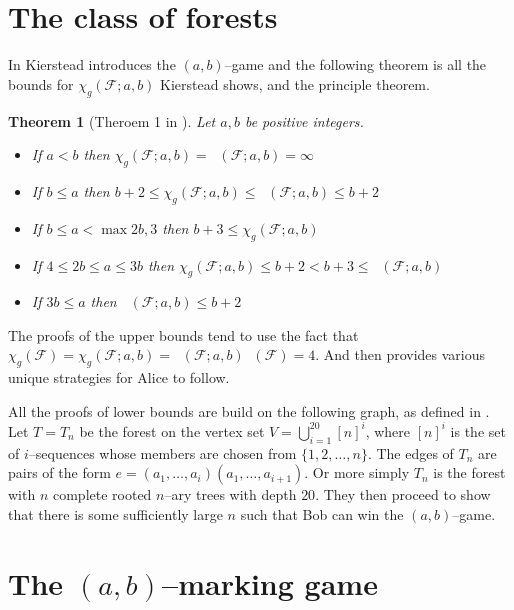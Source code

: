 \documentclass[11pt]{article}
\numberwithin{figure}{section}
\newtheorem{theorem}{Theorem}
\theoremstyle{definition}
\newcommand{\FF}{\mathcal{F}} %
\DeclareMathOperator{\col}{col_g}
\begin{document}
    \section{The class of forests}
    In \cite{kierstead2005} Kierstead introduces the $(a,b)$--game and the following theorem is all the bounds for $\chi_g(\FF;a,b)$ Kierstead shows, and the principle theorem.     
    \begin{theorem} [Theroem 1 in \cite{kierstead2005}]
        Let $a,b$ be positive integers.
        \begin{itemize}
            \item If $a<b$ then $\chi_g(\FF;a,b)=\col(\FF;a,b)=\infty$
            \item If $b\leq a$ then $b+2\leq \chi_g(\FF;a,b)\leq \col(\FF;a,b)\leq b+2$    
            \item If $b\leq a < \max{2b,3}$ then $b+3 \leq \chi_g(\FF;a,b)$
            \item If $4\leq 2b \leq a \leq 3b$ then $\chi_g(\FF;a,b)\leq b+2<b+3\leq \col(\FF;a,b)$
            \item If $3b\leq a$ then $\col(\FF;a,b)\leq b+2$ 
        \end{itemize}
    \end{theorem}
    
    The proofs of the upper bounds tend to use the fact that     
    $\chi_g(\FF)= \chi_g(\FF;a,b)= \col(\FF;a,b)\col(\FF)=4$. And then provides various unique strategies for Alice to follow.
    
    All the proofs of lower bounds are build on the following graph, as defined in \cite{kierstead2005}. Let $T=T_n$ be the forest on the vertex set $V=\bigcup_{i=1}^{20}[n]^i$, where $[n]^i$ is the set of $i$--sequences whose members are chosen from $\{1,2,\dots,n\}$. %
    The edges of $T_n$ are pairs of the form $e= (a_1,\dots,a_i) (a_1,\dots,a_{i+1})$. Or more simply $T_n$ is the forest with $n$ complete rooted $n$--ary trees with depth $20$. They then proceed to show that there is some sufficiently large $n$ such that Bob can win the $(a,b)$--game.
    
    
    \section{The $(a,b)$--marking game}
    
\end{document}
